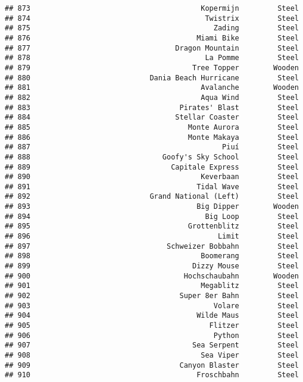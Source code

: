 \documentclass[
]{article}
\begin{document}
\begin{verbatim}
## 873                                        Kopermijn         Steel
## 874                                         Twistrix         Steel
## 875                                           Zading         Steel
## 876                                       Miami Bike         Steel
## 877                                  Dragon Mountain         Steel
## 878                                         La Pomme         Steel
## 879                                      Tree Topper        Wooden
## 880                            Dania Beach Hurricane         Steel
## 881                                        Avalanche        Wooden
## 882                                        Aqua Wind         Steel
## 883                                   Pirates' Blast         Steel
## 884                                  Stellar Coaster         Steel
## 885                                     Monte Aurora         Steel
## 886                                     Monte Makaya         Steel
## 887                                             Piuí         Steel
## 888                               Goofy's Sky School         Steel
## 889                                 Capitale Express         Steel
## 890                                        Keverbaan         Steel
## 891                                       Tidal Wave         Steel
## 892                            Grand National (Left)         Steel
## 893                                       Big Dipper        Wooden
## 894                                         Big Loop         Steel
## 895                                     Grottenblitz         Steel
## 896                                            Limit         Steel
## 897                                Schweizer Bobbahn         Steel
## 898                                        Boomerang         Steel
## 899                                      Dizzy Mouse         Steel
## 900                                    Hochschaubahn        Wooden
## 901                                        Megablitz         Steel
## 902                                   Super 8er Bahn         Steel
## 903                                           Volare         Steel
## 904                                       Wilde Maus         Steel
## 905                                          Flitzer         Steel
## 906                                           Python         Steel
## 907                                      Sea Serpent         Steel
## 908                                        Sea Viper         Steel
## 909                                   Canyon Blaster         Steel
## 910                                       Froschbahn         Steel

\end{verbatim}
\end{document}
